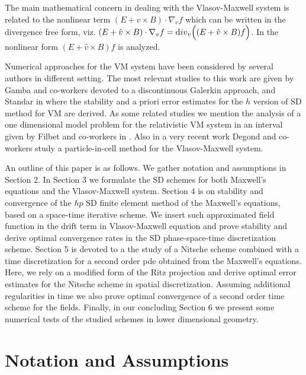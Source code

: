 \documentclass[reqno,a4paper]{amsart}
\theoremstyle{remark}
\numberwithin{equation}{section}
\begin{document}
 
The main mathematical 
concern in dealing with the Vlasov-Maxwell system is related to the 
nonlinear term $(E+\hat v \times B)\cdot\nabla_v f$ which can be written in 
the divergence free form, viz. 
$(E+\hat v \times B)\cdot\nabla_v f={\mbox div}_v\Big((E+\hat v \times B)f\Big)$.
In \cite{DiPerna_Lions} the nonlinear form $(E+\hat v \times B) f$ is analyzed. 

Numerical approaches for the VM system 
 have been considered by several authors in different setting. 
The most relevant studies to this work are given by 
Gamba and co-workers \cite{Che} devoted to 
a discontinuous Galerkin approach, and Standar in \cite{Standar:2016} where 
the stability and a priori error estimates for  
the $h$ version of SD method for VM are derived. 
As some related studies we mention the  analysis of 
a one dimensional model problem for the relativistic 
VM system in an interval given by Filbet and co-workers in 
\cite{Filbet_etal}. Also in a very recent work \cite{Degond_etal} 
Degond and co-workers study  a particle-in-cell method 
for the Vlasov-Maxwell system. 

An outline of this paper is as follows. 
We gather notation and assumptions in Section 2. 
In Section 3 we formulate the SD schemes for both Maxwell's equations and the 
Vlasov-Maxwell system. Section 4 is on stability and convergence of the 
$hp$ SD finite element method of the Maxwell's equations, based on a
space-time iterative scheme. We insert such approximated field function 
in the drift term in Vlasov-Maxwell equation and prove stability and 
derive optimal convergence rates in the SD 
phase-space-time discretization scheme. Section 5 is devoted to a 
the study of a Nitsche 
scheme combined with a  time discretization 
for a second order pde obtained from the Maxwell's equations. 
Here, we rely on a modified form of the Ritz projection and derive optimal 
error estimates for the Nitsche scheme in spatial discretization. 
Assuming additional regularities in time we also prove optimal convergence of 
a second order time scheme for the fields. 
Finally, in our concluding Section 6 we present some numerical tests
of the studied schemes in lower dimensional geometry.


\section{Notation and Assumptions}
\end{document}
